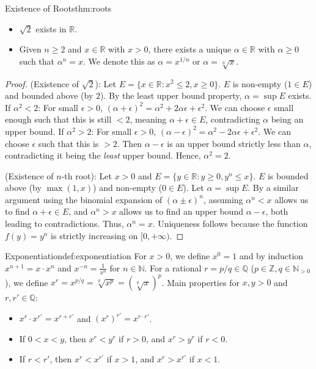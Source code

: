 \documentclass[11pt, a4paper]{article}
\begin{document}
\begin{theorem}{Existence of Roots}{thm:roots}
\begin{itemize}
    \item $\sqrt{2}$ exists in $\mathbb{R}$. 
    \item Given $n \ge 2$ and $x \in \mathbb{R}$ with $x > 0$, there exists a unique $\alpha \in \mathbb{R}$ with $\alpha \ge 0$ such that $\alpha^n = x$. We denote this as $\alpha = x^{1/n}$ or $\alpha = \sqrt[n]{x}$.
\end{itemize}
\end{theorem}
\begin{proof}
(Existence of $\sqrt{2}$): Let $E = \{x \in \mathbb{R} : x^2 \le 2, x \ge 0\}$. $E$ is non-empty ($1 \in E$) and bounded above (by $2$).
By the least upper bound property, $\alpha = \sup E$ exists.
If $\alpha^2 < 2$: For small $\epsilon > 0$, $(\alpha + \epsilon)^2 = \alpha^2 + 2\alpha\epsilon + \epsilon^2$. We can choose $\epsilon$ small enough such that this is still $< 2$, meaning $\alpha+\epsilon \in E$, contradicting $\alpha$ being an upper bound.
If $\alpha^2 > 2$: For small $\epsilon > 0$, $(\alpha - \epsilon)^2 = \alpha^2 - 2\alpha\epsilon + \epsilon^2$. We can choose $\epsilon$ such that this is $> 2$. Then $\alpha - \epsilon$ is an upper bound strictly less than $\alpha$, contradicting it being the \textit{least} upper bound.
Hence, $\alpha^2 = 2$.

(Existence of $n$-th root): Let $x > 0$ and $E = \{y \in \mathbb{R} : y \ge 0, y^n \le x\}$. $E$ is bounded above (by $\max(1, x)$) and non-empty ($0 \in E$). Let $\alpha = \sup E$. By a similar argument using the binomial expansion of $(\alpha \pm \epsilon)^n$, assuming $\alpha^n < x$ allows us to find $\alpha + \epsilon \in E$, and $\alpha^n > x$ allows us to find an upper bound $\alpha - \epsilon$, both leading to contradictions. Thus, $\alpha^n = x$.
Uniqueness follows because the function $f(y) = y^n$ is strictly increasing on $[0, +\infty)$.
\end{proof}

\begin{definition}{Exponentiation}{def:exponentiation}
For $x > 0$, we define $x^0 = 1$ and by induction $x^{n+1} = x \cdot x^n$ and $x^{-n} = \frac{1}{x^n}$ for $n \in \mathbb{N}$. For a rational $r = p/q \in \mathbb{Q}$ ($p \in \mathbb{Z}, q \in \mathbb{N}_{>0}$), we define $x^r = x^{p/q} = \sqrt[q]{x^p} = (\sqrt[q]{x})^p$.
Main properties for $x, y > 0$ and $r, r' \in \mathbb{Q}$:
\begin{itemize}
    \item $x^r \cdot x^{r'} = x^{r+r'}$ and $(x^r)^{r'} = x^{r \cdot r'}$.
    \item If $0 < x < y$, then $x^r < y^r$ if $r > 0$, and $x^r > y^r$ if $r < 0$.
    \item If $r < r'$, then $x^r < x^{r'}$ if $x > 1$, and $x^r > x^{r'}$ if $x < 1$.
\end{itemize}
\end{definition}
\end{document}
